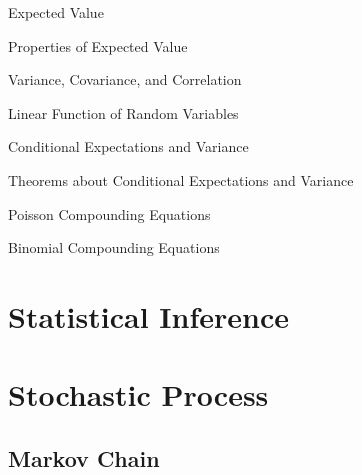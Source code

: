 \documentclass{beamer}
\begin{document}
\begin{frame}{Expected Value}

\end{frame}

\begin{frame}[allowframebreaks]{Properties of Expected Value}

\end{frame}

\begin{frame}[allowframebreaks]{Variance, Covariance, and Correlation}

\end{frame}

\begin{frame}[allowframebreaks]{Linear Function of Random Variables}

\end{frame}

\begin{frame}{Conditional Expectations and Variance}

\end{frame}

\begin{frame}{Theorems about Conditional Expectations and Variance}

\end{frame}


    

\begin{frame}{Poisson Compounding Equations}

\end{frame}

\begin{frame}{Binomial Compounding Equations}

\end{frame}




\section{Statistical Inference} 





\section{Stochastic Process}

\subsection{Markov Chain} 
\end{document}
